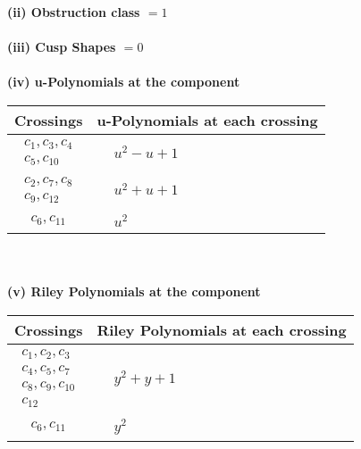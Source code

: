 \documentclass[1p]{elsarticle_modified}
\theoremstyle{definition}
\begin{document}
\flushleft \textbf{(ii) Obstruction class $= 1$}\\~\\
\flushleft \textbf{(iii) Cusp Shapes $= 0$}\\~\\
\newpage\renewcommand{\arraystretch}{1}
\flushleft \textbf{(iv) u-Polynomials at the component}\newline \\
\begin{tabular}{m{50pt}|m{274pt}}
Crossings & \hspace{64pt}u-Polynomials at each crossing \\
\hline $$\begin{aligned}c_{1},c_{3},c_{4}\\c_{5},c_{10}\end{aligned}$$&$\begin{aligned}
&u^2- u+1
\end{aligned}$\\
\hline $$\begin{aligned}c_{2},c_{7},c_{8}\\c_{9},c_{12}\end{aligned}$$&$\begin{aligned}
&u^2+u+1
\end{aligned}$\\
\hline $$\begin{aligned}c_{6},c_{11}\end{aligned}$$&$\begin{aligned}
&u^2
\end{aligned}$\\
\hline
\end{tabular}\\~\\
\newpage\renewcommand{\arraystretch}{1}
\flushleft \textbf{(v) Riley Polynomials at the component}\newline \\
\begin{tabular}{m{50pt}|m{274pt}}
Crossings & \hspace{64pt}Riley Polynomials at each crossing \\
\hline $$\begin{aligned}c_{1},c_{2},c_{3}\\c_{4},c_{5},c_{7}\\c_{8},c_{9},c_{10}\\c_{12}\end{aligned}$$&$\begin{aligned}
&y^2+y+1
\end{aligned}$\\
\hline $$\begin{aligned}c_{6},c_{11}\end{aligned}$$&$\begin{aligned}
&y^2
\end{aligned}$\\
\hline
\end{tabular}\\~\\
\end{document}

